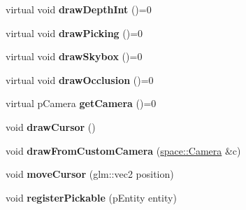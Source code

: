 \begin{DoxyCompactItemize}
\item 
\hypertarget{classfillwave_1_1models_1_1Scene_a9c64a1056f2962d310e2ef23eae68b87}{}virtual void {\bfseries draw\+Depth\+Int} ()=0\label{classfillwave_1_1models_1_1Scene_a9c64a1056f2962d310e2ef23eae68b87}

\item 
\hypertarget{classfillwave_1_1models_1_1Scene_a68760bc291faf75ed38dd0218b1270c3}{}virtual void {\bfseries draw\+Picking} ()=0\label{classfillwave_1_1models_1_1Scene_a68760bc291faf75ed38dd0218b1270c3}

\item 
\hypertarget{classfillwave_1_1models_1_1Scene_a937701e063a7d92db19efaa5ed7f08b4}{}virtual void {\bfseries draw\+Skybox} ()=0\label{classfillwave_1_1models_1_1Scene_a937701e063a7d92db19efaa5ed7f08b4}

\item 
\hypertarget{classfillwave_1_1models_1_1Scene_a21a5588e78971098e1bd14867b960ac8}{}virtual void {\bfseries draw\+Occlusion} ()=0\label{classfillwave_1_1models_1_1Scene_a21a5588e78971098e1bd14867b960ac8}

\item 
\hypertarget{classfillwave_1_1models_1_1Scene_a6ebfb73dfcc9638d7c3d3658b7a89095}{}virtual p\+Camera {\bfseries get\+Camera} ()=0\label{classfillwave_1_1models_1_1Scene_a6ebfb73dfcc9638d7c3d3658b7a89095}

\item 
\hypertarget{classfillwave_1_1models_1_1Scene_aed4952f6b280e1d7d039cc084eb9be46}{}void {\bfseries draw\+Cursor} ()\label{classfillwave_1_1models_1_1Scene_aed4952f6b280e1d7d039cc084eb9be46}

\item 
\hypertarget{classfillwave_1_1models_1_1Scene_a5080ce5962be41618b1895dd81f5707e}{}void {\bfseries draw\+From\+Custom\+Camera} (\hyperlink{classfillwave_1_1space_1_1Camera}{space\+::\+Camera} \&c)\label{classfillwave_1_1models_1_1Scene_a5080ce5962be41618b1895dd81f5707e}

\item 
\hypertarget{classfillwave_1_1models_1_1Scene_add10bd18bd40f95278a2b9fb791c2cb2}{}void {\bfseries move\+Cursor} (glm\+::vec2 position)\label{classfillwave_1_1models_1_1Scene_add10bd18bd40f95278a2b9fb791c2cb2}

\item 
\hypertarget{classfillwave_1_1models_1_1Scene_a07c51b48a9460d5832737565b81120c3}{}void {\bfseries register\+Pickable} (p\+Entity entity)\label{classfillwave_1_1models_1_1Scene_a07c51b48a9460d5832737565b81120c3}


\end{DoxyCompactItemize}
